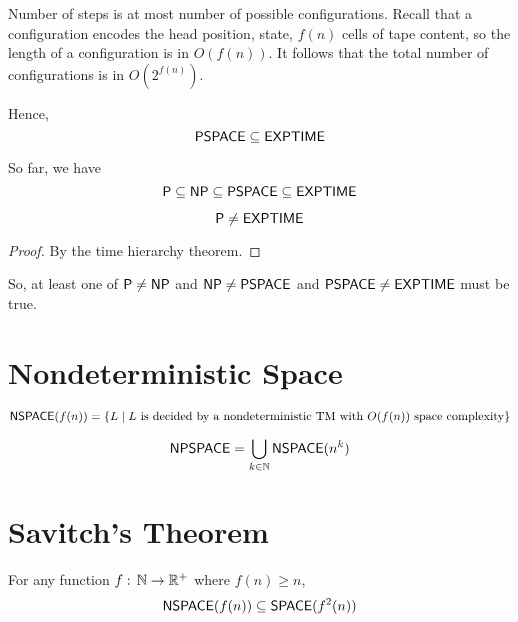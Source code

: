 Number of steps is at most number of possible configurations. Recall that a configuration encodes the head position, state, $f(n)$ cells of tape content, so the length of a configuration is in $O(f(n))$. It follows that the total number of configurations is in $O(2^{f(n)})$.

Hence,
$$
\mathsf{PSPACE} \subseteq \mathsf{EXPTIME}
$$

So far, we have
$$
\mathsf{P} \subseteq \mathsf{NP} \subseteq \mathsf{PSPACE} \subseteq \mathsf{EXPTIME}
$$

\begin{theorem}
    $$
    \mathsf{P} \neq \mathsf{EXPTIME}
    $$
\end{theorem}

\begin{proof}
    By the time hierarchy theorem.
\end{proof}

So, at least one of $\mathsf{P} \neq \mathsf{NP}$ and $\mathsf{NP} \neq \mathsf{PSPACE}$ and $\mathsf{PSPACE} \neq \mathsf{EXPTIME}$ must be true.

\section{Nondeterministic Space}

\begin{definition}[NSPACE]
    $$
    \mathsf{NSPACE}(f(n)) = \{ L \mid \text{$L$ is decided by a nondeterministic TM with $O(f(n))$ space complexity}\}
    $$
\end{definition}

\begin{definition}[NPSPACE]
    $$
    \mathsf{NPSPACE} = \bigcup_{k \in \mathbb{N}} \mathsf{NSPACE}(n^k)
    $$
\end{definition}

\section{Savitch's Theorem}

\begin{theorem}
    For any function $f:\,\mathbb{N} \to \mathbb{R}^+$ where $f(n) \geq n$,
    $$
    \mathsf{NSPACE}(f(n)) \subseteq \mathsf{SPACE}(f^2(n))
    $$
\end{theorem}

